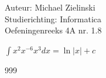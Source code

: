 \documentclass[a4paper]{article}
\begin{document}
\noindent \large Auteur: Michael Zielinski \\
\noindent \large Studierichting: Informatica \\
\noindent \large Oefeningenreeks 4A nr. 1.8 \\

\medskip 

\normalsize

$\displaystyle\int x^2 x^{-6} x^3 dx = \ln|x| + c$

\begin{thebibliography}{999}
\end{thebibliography}
\end{document}
